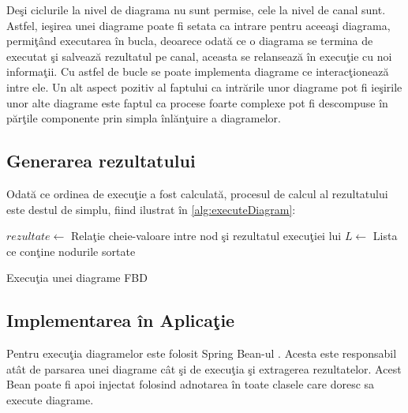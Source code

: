 Deşi ciclurile la nivel de diagrama nu sunt permise, cele la nivel de canal sunt. Astfel, ieşirea unei diagrame poate fi setata ca intrare pentru aceeaşi diagrama, permiţând executarea în bucla, deoarece odată ce o diagrama se termina de executat şi salvează rezultatul pe canal, aceasta se relansează în execuţie cu noi informaţii. Cu astfel de bucle se poate implementa diagrame ce interacţionează intre ele. Un alt aspect pozitiv al faptului ca intrările unor diagrame pot fi ieşirile unor alte diagrame este faptul ca procese foarte complexe pot fi descompuse în părţile componente prin simpla înlănţuire a diagramelor.

\subsection{Generarea rezultatului}
Odată ce ordinea de execuţie a fost calculată, procesul de calcul al rezultatului este destul de simplu, fiind ilustrat în \cref{alg:executeDiagram}:

\begin{algorithm}[H]
	$rezultate \gets$ Relaţie cheie-valoare intre nod şi rezultatul execuţiei lui\;
	$L \gets$ Lista ce conţine nodurile sortate \;
	
	{}
	\label{alg:executeDiagram}
	\caption{Execuţia unei diagrame FBD}
\end{algorithm}

\subsection{Implementarea în Aplicaţie}
Pentru execuţia diagramelor este folosit Spring Bean-ul . Acesta este responsabil atât de parsarea unei diagrame cât şi de execuţia şi extragerea rezultatelor. Acest Bean poate fi apoi injectat folosind adnotarea  în toate clasele care doresc sa execute diagrame.

